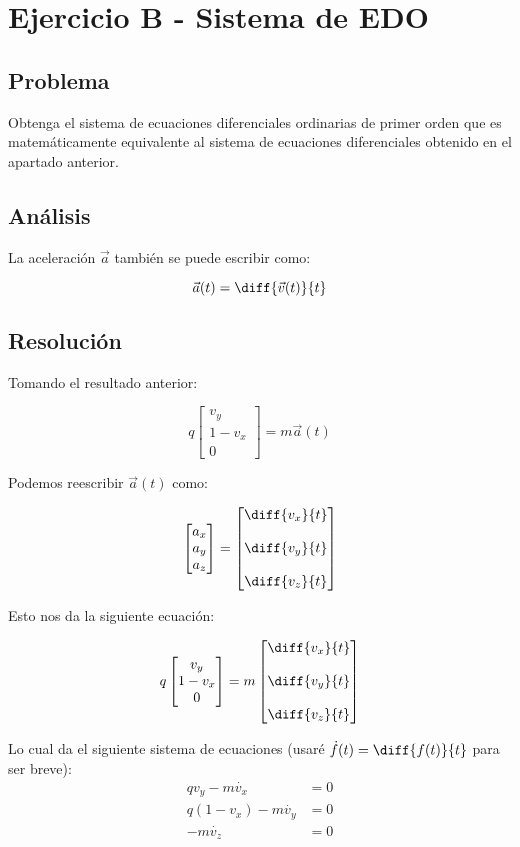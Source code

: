 
\section{Ejercicio B - Sistema de EDO}

\subsection{Problema}

Obtenga el sistema de ecuaciones diferenciales ordinarias de primer orden que es matemáticamente equivalente al sistema de ecuaciones diferenciales obtenido en el apartado anterior.

\subsection{Análisis}

La aceleración $\vec{a}$ también se puede escribir como:

\begin{equation}
	\vec{a}(t) = \diff{\vec{v}(t)}{t}
\end{equation}

\subsection{Resolución}

Tomando el resultado anterior:

$$
	q \begin{bmatrix}
	v_y \\
	1 - v_x \\
	0
\end{bmatrix} = m \vec{a}(t)
$$

Podemos reescribir $\vec{a}(t)$ como:

$$
\begin{bmatrix} a_x \\ a_y \\ a_z \end{bmatrix} =
\begin{bmatrix} 
	\diff{v_x}{t} \\ \\
	\diff{v_y}{t} \\ \\
	\diff{v_z}{t} 
\end{bmatrix}
$$

Esto nos da la siguiente ecuación:

$$
q \begin{bmatrix}
	v_y \\
	1 - v_x \\
	0
\end{bmatrix} = m \begin{bmatrix} 
\diff{v_x}{t} \\ \\
\diff{v_y}{t} \\ \\
\diff{v_z}{t} 
\end{bmatrix}
$$

Lo cual da el siguiente sistema de ecuaciones (usaré $\dot{f}(t) = \diff{f(t)}{t}$ para ser breve):
\begin{align*}
	q v_y - m \dot{v_x} &= 0 \\
	q(1 - v_x) - m \dot{v_y} &= 0 \\
	-m \dot{v_z} &= 0
\end{align*}
	